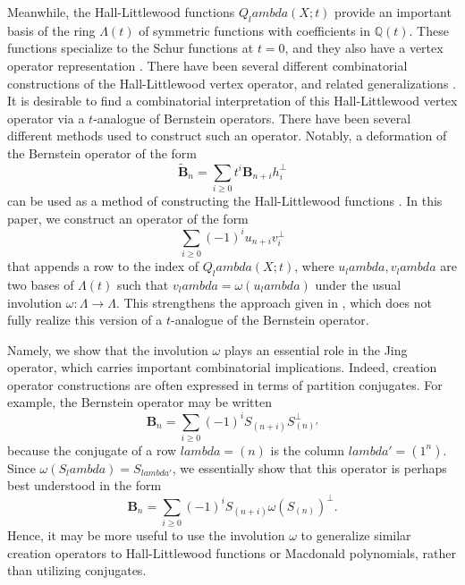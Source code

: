 \documentclass[12pt]{amsart}%
\def\lambda{lambda}%
\theoremstyle{remark}
\theoremstyle{definition}
\newcommand{\Q}{\mathbb{Q}}
\begin{document}
    Meanwhile, the Hall-Littlewood functions $Q_\lambda(X;t)$ provide an important basis of the ring $\Lambda(t)$ of symmetric functions with coefficients in $\Q(t)$. These functions specialize to the Schur functions at $t=0$, and they also have a vertex operator representation \cite{jing:1991b}. There have been several different combinatorial constructions of the Hall-Littlewood vertex operator, and related generalizations \cite{garsia:1992,macdonald:1995,shimozono-zabrocki:2001,zabrocki:2000a,zabrocki:2000b}. It is desirable to find a combinatorial interpretation of this Hall-Littlewood vertex operator via a $t$-analogue of Bernstein operators. There have been several different methods used to construct such an operator. Notably, a deformation of the Bernstein operator of the form
    \[\widetilde{\mathbf{B}}_n=\sum_{i\geq0}t^i\mathbf{B}_{n+i}h_i^\perp\]
    can be used as a method of constructing the Hall-Littlewood functions \cite{berg-bergeron-aliola-serrano-zabrocki:2014}. In this paper, we construct an operator of the form
    \[\sum_{i\geq0}(-1)^i u_{n+i}v_i^\perp\]
    that appends a row to the index of $Q_\lambda(X;t)$, where $u_\lambda,v_\lambda$ are two bases of $\Lambda(t)$ such that $v_\lambda=\omega(u_\lambda)$ under the usual involution $\omega:\Lambda\to\Lambda$. This strengthens the approach given in \cite[p.~236-238]{macdonald:1995}, which does not fully realize this version of a $t$-analogue of the Bernstein operator. 
    
    Namely, we show that the involution $\omega$ plays an essential role in the Jing operator, which carries important combinatorial implications. Indeed, creation operator constructions are often expressed in terms of partition conjugates. For example, the Bernstein operator may be written
    \[\mathbf{B}_n=\sum_{i\geq0}(-1)^i S_{(n+i)}S_{(n)'}^\perp\]
    because the conjugate of a row $\lambda=(n)$ is the column $\lambda'=(1^n)$. Since $\omega(S_\lambda)=S_{\lambda'}$, we essentially show that this operator is perhaps best understood in the form
    \[\mathbf{B}_n=\sum_{i\geq0}(-1)^i S_{(n+i)}\omega(S_{(n)})^\perp.\]
    Hence, it may be more useful to use the involution $\omega$ to generalize similar creation operators to Hall-Littlewood functions or Macdonald polynomials, rather than utilizing conjugates.
\end{document}
